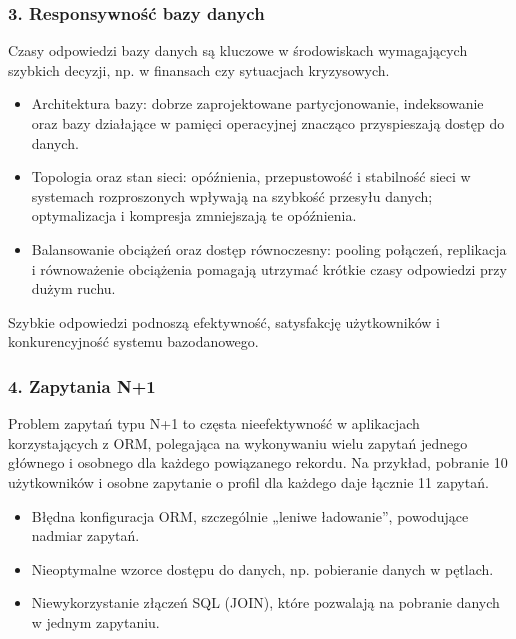 \documentclass[letterpaper,10pt,polish]{sphinxmanual}
\begin{document}
\subsubsection{3. Responsywność bazy danych}
\label{\detokenize{rozdzial2/Wydajnosc_Skalowanie_i_Replikacja/index:responsywnosc-bazy-danych}}
\sphinxAtStartPar
Czasy odpowiedzi bazy danych są kluczowe w środowiskach wymagających szybkich decyzji, np. w finansach czy sytuacjach kryzysowych.
\begin{description}
\begin{itemize}
\item {} 
\sphinxAtStartPar
Architektura bazy: dobrze zaprojektowane partycjonowanie, indeksowanie oraz bazy działające w pamięci operacyjnej znacząco przyspieszają dostęp do danych.

\item {} 
\sphinxAtStartPar
Topologia oraz stan sieci: opóźnienia, przepustowość i stabilność sieci w systemach rozproszonych wpływają na szybkość przesyłu danych; optymalizacja i kompresja zmniejszają te opóźnienia.

\item {} 
\sphinxAtStartPar
Balansowanie obciążeń oraz dostęp równoczesny: pooling połączeń, replikacja i równoważenie obciążenia pomagają utrzymać krótkie czasy odpowiedzi przy dużym ruchu.

\end{itemize}

\end{description}

\sphinxAtStartPar
Szybkie odpowiedzi podnoszą efektywność, satysfakcję użytkowników i konkurencyjność systemu bazodanowego.


\subsubsection{4. Zapytania N+1}
\label{\detokenize{rozdzial2/Wydajnosc_Skalowanie_i_Replikacja/index:zapytania-n-1}}
\sphinxAtStartPar
Problem zapytań typu N+1 to częsta nieefektywność w aplikacjach korzystających z ORM, polegająca na wykonywaniu wielu zapytań \textendash{} jednego głównego i osobnego dla każdego powiązanego rekordu. Na przykład, pobranie 10 użytkowników i osobne zapytanie o profil dla każdego daje łącznie 11 zapytań.
\begin{description}
\begin{itemize}
\item {} 
\sphinxAtStartPar
Błędna konfiguracja ORM, szczególnie „leniwe ładowanie”, powodujące nadmiar zapytań.

\item {} 
\sphinxAtStartPar
Nieoptymalne wzorce dostępu do danych, np. pobieranie danych w pętlach.

\item {} 
\sphinxAtStartPar
Niewykorzystanie złączeń SQL (JOIN), które pozwalają na pobranie danych w jednym zapytaniu.

\end{itemize}

\end{description}
\end{document}
